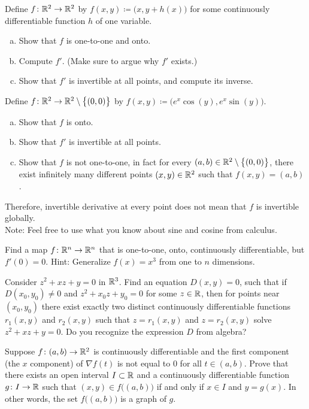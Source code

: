 \begin{exercise}
Define $f \colon {\mathbb{R}}^2 \to {\mathbb{R}}^2$ by $f(x,y) \coloneqq
\bigl(x,y+h(x)\bigr)$ for some continuously differentiable function $h$ of one
variable.
\begin{enumerate}[a)]
\item
Show that $f$ is one-to-one and onto.
\item
Compute $f'$.  (Make sure to argue why $f'$ exists.)
\item
Show that $f'$ is invertible at all points, and compute
its inverse.
\end{enumerate}
\end{exercise}

\begin{exercise}
Define $f \colon {\mathbb{R}}^2 \to {\mathbb{R}}^2 \setminus \bigl\{ (0,0) \bigr\}$ by
$f(x,y) \coloneqq \bigl(e^x\cos(y),e^x\sin(y)\bigr)$.
\begin{enumerate}[a)]
\item
Show that $f$ is onto.
\item
Show that $f'$ is invertible at all points.
\item
Show that $f$ is not one-to-one, in fact for every $(a,b) \in {\mathbb{R}}^2
\setminus \bigl\{ (0,0) \bigr\}$,
there exist infinitely many different points $(x,y) \in {\mathbb{R}}^2$ such that 
$f(x,y) = (a,b)$.
\end{enumerate}
Therefore, invertible derivative at every point does not mean that
$f$ is invertible globally.\\
Note: Feel free to use what you know about sine and cosine from calculus.
\end{exercise}

\begin{exercise}
Find a map $f \colon {\mathbb{R}}^n \to {\mathbb{R}}^n$ that is one-to-one, onto,
continuously differentiable, but $f'(0) = 0$.  Hint: Generalize $f(x) = x^3$ from one
to $n$ dimensions.
\end{exercise}

\begin{exercise}
Consider $z^2 + xz + y =0$ in ${\mathbb{R}}^3$.  Find an equation $D(x,y)=0$, such that
if $D(x_0,y_0) \not= 0$ and $z^2+x_0z+y_0 = 0$ for some $z \in {\mathbb{R}}$,
then for points near $(x_0,y_0)$ there exist
exactly two distinct continuously differentiable functions $r_1(x,y)$
and $r_2(x,y)$ such that $z=r_1(x,y)$ and $z=r_2(x,y)$ solve
$z^2 + xz + y =0$.  Do you recognize the expression $D$ from algebra?
\end{exercise}


\begin{exercise}
Suppose $f \colon (a,b) \to {\mathbb{R}}^2$ is continuously differentiable and
the first component (the $x$ component) of $\nabla f(t)$ is not equal to 0
for all $t \in (a,b)$.
Prove that there exists an open interval $I \subset {\mathbb{R}}$ and
a continuously differentiable function $g \colon I \to {\mathbb{R}}$
such that 
$(x,y) \in f\bigl((a,b)\bigr)$ if and only if $x \in I$ and $y=g(x)$.
In other words, the set
$f\bigl((a,b)\bigr)$ is a graph of $g$.
\end{exercise}

